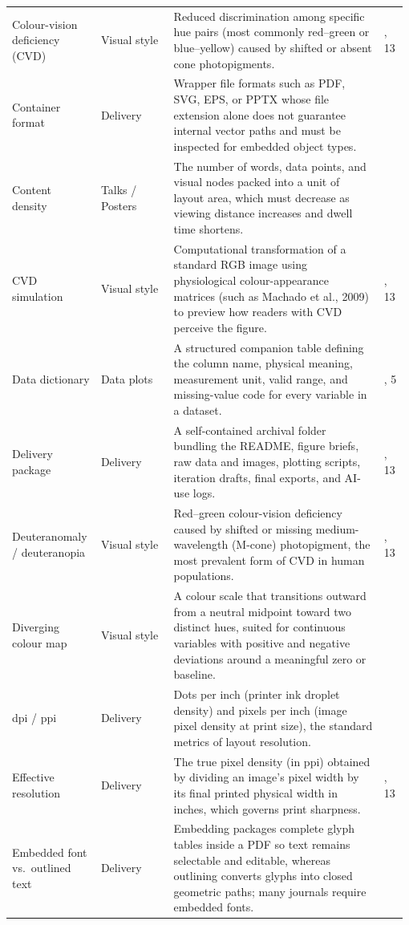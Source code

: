 \begin{longtable}{@{}>{\raggedright\arraybackslash}p{0.22\linewidth}>{\raggedright\arraybackslash}p{0.18\linewidth}>{\raggedright\arraybackslash}p{0.52\linewidth}>{\raggedright\arraybackslash}p{0.06\linewidth}@{}}
Colour-vision deficiency (CVD) & Visual style & Reduced discrimination among specific hue pairs (most commonly red--green or blue--yellow) caused by shifted or absent cone photopigments. & 4, 13 \\
Container format & Delivery & Wrapper file formats such as PDF, SVG, EPS, or PPTX whose file extension alone does not guarantee internal vector paths and must be inspected for embedded object types. & 13 \\
Content density & Talks / Posters & The number of words, data points, and visual nodes packed into a unit of layout area, which must decrease as viewing distance increases and dwell time shortens. & 12 \\
CVD simulation & Visual style & Computational transformation of a standard RGB image using physiological colour-appearance matrices (such as Machado et al., 2009) to preview how readers with CVD perceive the figure. & 4, 13 \\
Data dictionary & Data plots & A structured companion table defining the column name, physical meaning, measurement unit, valid range, and missing-value code for every variable in a dataset. & 1, 5 \\
Delivery package & Delivery & A self-contained archival folder bundling the README, figure briefs, raw data and images, plotting scripts, iteration drafts, final exports, and AI-use logs. & 1, 13 \\
Deuteranomaly / deuteranopia & Visual style & Red--green colour-vision deficiency caused by shifted or missing medium-wavelength (M-cone) photopigment, the most prevalent form of CVD in human populations. & 4, 13 \\
Diverging colour map & Visual style & A colour scale that transitions outward from a neutral midpoint toward two distinct hues, suited for continuous variables with positive and negative deviations around a meaningful zero or baseline. & 4 \\
dpi / ppi & Delivery & Dots per inch (printer ink droplet density) and pixels per inch (image pixel density at print size), the standard metrics of layout resolution. & 13 \\
Effective resolution & Delivery & The true pixel density (in ppi) obtained by dividing an image's pixel width by its final printed physical width in inches, which governs print sharpness. & 8, 13 \\
Embedded font vs.\ outlined text & Delivery & Embedding packages complete glyph tables inside a PDF so text remains selectable and editable, whereas outlining converts glyphs into closed geometric paths; many journals require embedded fonts. & 13 \\

\end{longtable}
